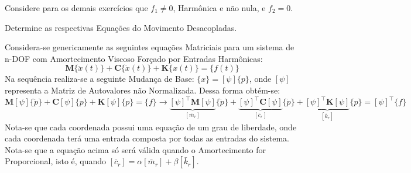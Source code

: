 \documentclass{article}
\begin{document}
\newpage\begin{exercise}\label{ex3}
    Considere para os demais exercícios que $f_1 \neq 0$, Harmônica e não nula, e $f_2 = 0$.
\end{exercise}
\begin{exercise}\label{ex4}
    Determine as respectivas Equações do Movimento Desacopladas.
\end{exercise}
\begin{resolution}
    Considera-se genericamente as seguintes equações Matriciais para um sistema de n-DOF com Amortecimento Viscoso Forçado por Entradas Harmônicas:
    \begin{equation}
        \mathbf{M}\{\ddot{x}(t)\} + \mathbf{C}\{\dot{x}(t)\} + \mathbf{K}\{x(t)\} = \{f(t)\}\label{eq:nDOFAF}
    \end{equation}
    Na sequência realiza-se a seguinte Mudança de Base: $\{x\} = [\psi] \{p\}$, onde $[\psi]$ representa a Matriz de Autovalores não Normalizada. Dessa forma obtém-se:
    \begin{equation*}
        \mathbf{M}[\psi]\{\ddot{p}\} + \mathbf{C}[\psi]\{\dot{p}\} + \mathbf{K}[\psi]\{p\} = \{f\} \to
        \underbrace{[\psi]^\intercal\mathbf{M}[\psi]}_{[\bar{m}_{r}]}\{\ddot{p}\} + 
        \underbrace{[\psi]^\intercal\mathbf{C}[\psi]}_{[\bar{c}_{r}]}\{\dot{p}\} + 
        \underbrace{[\psi]^\intercal\mathbf{K}[\psi]}_{[\bar{k}_{r}]}\{p\} = 
        [\psi]^\intercal\{f\}
    \end{equation*}
    Nota-se que cada coordenada possui uma equação de um grau de liberdade, onde cada coordenada terá uma entrada composta por todas as entradas do sistema.\\
    
    Nota-se que a equação acima só será válida quando o Amortecimento for Proporcional, isto é, quando $[\bar{c}_r] = \alpha [\bar{m}_r] + \beta [\bar{k}_r]$.\\


\end{resolution}
\end{document}
